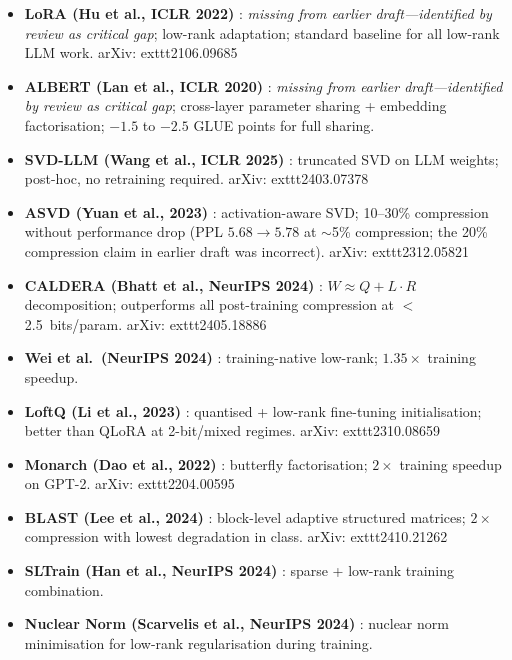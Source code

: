 \documentclass[11pt]{article}
\begin{document}
\begin{itemize}
  \item \textbf{LoRA (Hu et al., ICLR 2022)} \cite{HuEtAl2022}: \emph{missing from earlier draft---identified by review as critical gap}; low-rank adaptation; standard baseline for all low-rank LLM work.
    arXiv:	exttt{2106.09685}

  \item \textbf{ALBERT (Lan et al., ICLR 2020)} \cite{LanEtAl2020}: \emph{missing from earlier draft---identified by review as critical gap}; cross-layer parameter sharing + embedding factorisation; $-1.5$ to $-2.5$ GLUE points for full sharing.

  \item \textbf{SVD-LLM (Wang et al., ICLR 2025)} \cite{WangEtAl2024SVDLLM}: truncated SVD on LLM weights; post-hoc, no retraining required.
    arXiv:	exttt{2403.07378}

  \item \textbf{ASVD (Yuan et al., 2023)} \cite{YuanEtAl2023ASVD}: activation-aware SVD; 10--30\% compression without performance drop (PPL $5.68\to 5.78$ at $\sim$5\% compression; the 20\% compression claim in earlier draft was incorrect).
    arXiv:	exttt{2312.05821}

  \item \textbf{CALDERA (Bhatt et al., NeurIPS 2024)} \cite{BhattEtAl2024}: $W \approx Q + L{\cdot}R$ decomposition; outperforms all post-training compression at $<$2.5~bits/param.
    arXiv:	exttt{2405.18886}

  \item \textbf{Wei et al.\ (NeurIPS 2024)} \cite{WeiEtAl2024}: training-native low-rank; $1.35\times$ training speedup.

  \item \textbf{LoftQ (Li et al., 2023)} \cite{LiEtAl2023LoftQ}: quantised + low-rank fine-tuning initialisation; better than QLoRA at 2-bit/mixed regimes.
    arXiv:	exttt{2310.08659}

  \item \textbf{Monarch (Dao et al., 2022)} \cite{DaoEtAl2022Monarch}: butterfly factorisation; $2\times$ training speedup on GPT-2.
    arXiv:	exttt{2204.00595}

  \item \textbf{BLAST (Lee et al., 2024)} \cite{LeeEtAl2024BLAST}: block-level adaptive structured matrices; $2\times$ compression with lowest degradation in class.
    arXiv:	exttt{2410.21262}

  \item \textbf{SLTrain (Han et al., NeurIPS 2024)} \cite{HanEtAl2024SLTrain}: sparse + low-rank training combination.

  \item \textbf{Nuclear Norm (Scarvelis et al., NeurIPS 2024)} \cite{ScarvellisEtAl2024}: nuclear norm minimisation for low-rank regularisation during training.
\end{itemize}
\end{document}

